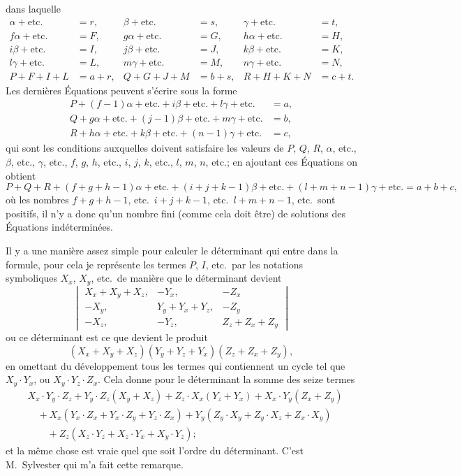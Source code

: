 \documentclass[11pt,a4paper]{book}
\theoremstyle{plain}
\begin{document}
dans laquelle
\begin{align*}
\alpha+\text{etc.}&=r, & \beta+\text{etc.}&=s, & \gamma+\text{etc.}&=t,\\
f\alpha+\text{etc.}&=F, & g\alpha+\text{etc.}&=G, & h\alpha+\text{etc.}&=H,\\
i\beta+\text{etc.}&=I, & j\beta+\text{etc.}&=J, & k\beta+\text{etc.}&=K,\\
l\gamma+\text{etc.}&=L, & m\gamma+\text{etc.}&=M, & n\gamma+\text{etc.}&=N,\\
P+F+I+L&=a+r, & Q+G+J+M&=b+s, & R+H+K+N&=c+t.
\end{align*}
Les derni\`{e}res \'{E}quations peuvent s'\'{e}crire sous la forme
\begin{align*}
P+(f-1)\alpha+\text{etc.}+i\beta+\text{etc.}+l\gamma+\text{etc.}&=a,\\
Q+g\alpha+\text{etc.}+(j-1)\beta+\text{etc.}+m\gamma+\text{etc.}&=b,\\
R+h\alpha+\text{etc.}+k\beta+\text{etc.}+(n-1)\gamma+\text{etc.}&=c,
\end{align*}
qui sont les conditions auxquelles doivent satisfaire les valeurs de $P$, $Q$, $R$, $\alpha$, etc., $\beta$, etc., $\gamma$, etc., $f$, $g$, $h$, etc., $i$, $j$, $k$, etc., $l$, $m$, $n$, etc.; en ajoutant ces \'{E}quations on obtient
\[
P+Q+R+(f+g+h-1)\alpha+\text{etc.}+(i+j+k-1)\beta+\text{etc.}+(l+m+n-1)\gamma+\text{etc.}=a+b+c,
\]
o\`{u} les nombres $f+g+h-1$, etc.\ $i+j+k-1$, etc.\ $l+m+n-1$, etc.\ sont positifs, il n'y a donc qu'un nombre fini (comme cela doit \^{e}tre) de solutions des \'{E}quations ind\'{e}termin\'{e}es.

Il y a une mani\`{e}re assez simple pour calculer le d\'{e}terminant qui entre dans la formule, pour cela je repr\'{e}sente les termes $P$, $I$, etc.\ par les notations symboliques $X_x$, $X_y$, etc.\ de mani\`{e}re que le d\'{e}terminant devient
\[
\begin{vmatrix}
X_x+X_y+X_z, & -Y_x, & -Z_x\\
-X_y, & Y_y+Y_x+Y_z, & -Z_y\\
-X_z, & -Y_z, & Z_z+Z_x+Z_y
\end{vmatrix}
\]
ou ce d\'{e}terminant est ce que devient le produit
\[
(X_x+X_y+X_z)(Y_y+Y_z+Y_x)(Z_z+Z_x+Z_y),
\]
en omettant du d\'{e}veloppement tous les termes qui contiennent un cycle tel que $X_y\cdot Y_x$, ou $X_y\cdot Y_z\cdot Z_x$. Cela donne pour le d\'{e}terminant la somme des seize termes
\begin{align*}
&X_x\cdot Y_y\cdot Z_z+Y_y\cdot Z_z(X_y+X_z)+Z_z\cdot X_x(Y_z+Y_x)+X_x\cdot Y_y(Z_x+Z_y)\\
&\quad +X_x(Y_x\cdot Z_x+Y_x\cdot Z_y+Y_z\cdot Z_x)+Y_y(Z_y\cdot X_y+Z_y\cdot X_z+Z_x\cdot X_y)\\
&\qquad +Z_z(X_z\cdot Y_z+X_z\cdot Y_x+X_y\cdot Y_z);
\end{align*}
et la m\^{e}me chose est vraie quel que soit l'ordre du d\'{e}terminant. C'est M.~Sylvester qui m'a fait cette remarque.
\end{document}
